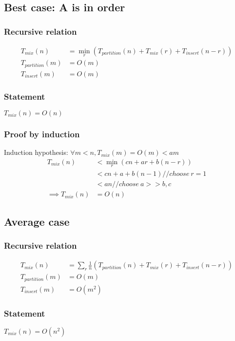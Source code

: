 \documentclass{article}
\begin{document}
\subsection{Best case: A is in order}

\subsubsection{Recursive relation}
\begin{align*}
T_{mix}(n) &= \min_r (T_{partition}(n) + T_{mix}(r) + T_{insert}(n-r))\\
T_{partition}(m) &= O(m)\\
T_{insert}(m) &= O(m)
\end{align*}

\subsubsection{Statement}
$T_{mix}(n) = O(n)$

\subsubsection{Proof by induction}
Induction hypothesis: $\forall m < n, T_{mix}(m) = O(m ) < am$
\begin{align*}
T_{mix}(n)
&< \min_r (cn + ar + b(n-r))\\
&< cn + a + b(n-1) // choose \ r = 1\\
&< an  // choose \ a >> b, c\\
\implies T_{mix}(n) &= O(n)
\end{align*}

\subsection{Average case}

\subsubsection{Recursive relation}
\begin{align*}
T_{mix}(n)
&= \sum_r \frac{1}{n}(T_{partition}(n) + T_{mix}(r) + T_{insert}(n-r))\\
T_{partition}(m) &= O(m)\\
T_{insert}(m) &= O(m^2)
\end{align*}

\subsubsection{Statement}
$T_{mix}(n) = O(n^2)$
\end{document}
